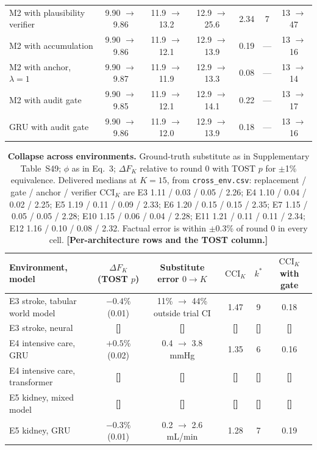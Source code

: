 \documentclass[11pt,a4paper]{article}
\newcommand{\tbd}[1]{{\color{red}\textbf{[#1]}}}
\newcommand{\CCI}{\mathrm{CCI}}
\begin{document}
\begin{table}[!htbp]
\begin{tabularx}{\textwidth}{@{}p{3.6cm} C C C c c C@{}}
M2 with plausibility verifier & 9.90 $\to$ 9.86 & 11.9 $\to$ 13.2 & 12.9 $\to$ 25.6 & 2.34 & 7 & 13 $\to$ 47\\
M2 with accumulation & 9.90 $\to$ 9.86 & 11.9 $\to$ 12.1 & 12.9 $\to$ 13.9 & 0.19 & --- & 13 $\to$ 16\\
M2 with anchor, $\lambda=1$ & 9.90 $\to$ 9.87 & 11.9 $\to$ 11.9 & 12.9 $\to$ 13.3 & 0.08 & --- & 13 $\to$ 14\\
M2 with audit gate & 9.90 $\to$ 9.85 & 11.9 $\to$ 12.1 & 12.9 $\to$ 14.1 & 0.22 & --- & 13 $\to$ 17\\
GRU with audit gate & 9.90 $\to$ 9.86 & 11.9 $\to$ 12.0 & 12.9 $\to$ 13.9 & 0.18 & --- & 13 $\to$ 16\\
\bottomrule\end{tabularx}
\end{table}
\FloatBarrier
\begin{table}[!htbp]\centering\footnotesize
\caption{\textbf{Collapse across environments.} Ground-truth substitute as in Supplementary Table~S49; $\phi$ as in Eq.~3; $\Delta F_K$ relative to round 0 with TOST $p$ for $\pm$1\% equivalence. Delivered medians at $K=15$, from \texttt{cross\_env.csv}: replacement / gate / anchor / verifier $\CCI_K$ are E3 1.11 / 0.03 / 0.05 / 2.26; E4 1.10 / 0.04 / 0.02 / 2.25; E5 1.19 / 0.11 / 0.09 / 2.33; E6 1.20 / 0.15 / 0.15 / 2.35; E7 1.15 / 0.05 / 0.05 / 2.28; E10 1.15 / 0.06 / 0.04 / 2.28; E11 1.21 / 0.11 / 0.11 / 2.34; E12 1.16 / 0.10 / 0.08 / 2.32. Factual error is within $\pm0.3$\% of round 0 in every cell. \tbd{Per-architecture rows and the TOST column.}}\label{tab:cross}
\begin{tabularx}{\textwidth}{@{}p{4.2cm} C C c c C@{}}\toprule
Environment, model & $\Delta F_K$ (TOST $p$) & Substitute error $0\to K$ & $\CCI_K$ & $k^*$ & $\CCI_K$ with gate\\\midrule
E3 stroke, tabular world model & $-0.4$\% (0.01) & 11\% $\to$ 44\% outside trial CI & 1.47 & 9 & 0.18\\
E3 stroke, neural & \tbd{} & \tbd{} & \tbd{} & \tbd{} & \tbd{}\\
E4 intensive care, GRU & $+0.5$\% (0.02) & 0.4 $\to$ 3.8 mmHg & 1.35 & 6 & 0.16\\
E4 intensive care, transformer & \tbd{} & \tbd{} & \tbd{} & \tbd{} & \tbd{}\\
E5 kidney, mixed model & \tbd{} & \tbd{} & \tbd{} & \tbd{} & \tbd{}\\
E5 kidney, GRU & $-0.3$\% (0.01) & 0.2 $\to$ 2.6 mL/min & 1.28 & 7 & 0.19\\

\end{tabularx}
\end{table}
\end{document}
